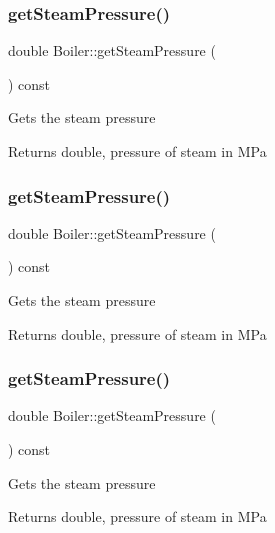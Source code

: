 \subsubsection{\texorpdfstring{get\+Steam\+Pressure()}{getSteamPressure()}\hspace{0.1cm}{\footnotesize\ttfamily [1/3]}}
{\footnotesize\ttfamily double Boiler\+::get\+Steam\+Pressure (\begin{DoxyParamCaption}{ }\end{DoxyParamCaption}) const}

Gets the steam pressure \begin{DoxyReturn}{Returns}
double, pressure of steam in M\+Pa 
\end{DoxyReturn}
\mbox{\label{class_boiler_a99d4bbace6ef20bcbdc4b0cfcdc43213}} 
\subsubsection{\texorpdfstring{get\+Steam\+Pressure()}{getSteamPressure()}\hspace{0.1cm}{\footnotesize\ttfamily [2/3]}}
{\footnotesize\ttfamily double Boiler\+::get\+Steam\+Pressure (\begin{DoxyParamCaption}{ }\end{DoxyParamCaption}) const}

Gets the steam pressure \begin{DoxyReturn}{Returns}
double, pressure of steam in M\+Pa 
\end{DoxyReturn}
\mbox{\label{class_boiler_a99d4bbace6ef20bcbdc4b0cfcdc43213}} 
\subsubsection{\texorpdfstring{get\+Steam\+Pressure()}{getSteamPressure()}\hspace{0.1cm}{\footnotesize\ttfamily [3/3]}}
{\footnotesize\ttfamily double Boiler\+::get\+Steam\+Pressure (\begin{DoxyParamCaption}{ }\end{DoxyParamCaption}) const}

Gets the steam pressure \begin{DoxyReturn}{Returns}
double, pressure of steam in M\+Pa 
\end{DoxyReturn}


